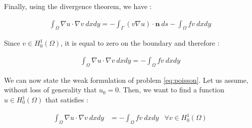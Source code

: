 Finally, using the divergence theorem, we have : 

\begin{align}
\int_\Omega \nabla u \cdot \nabla v \:dxdy = -\int_\Gamma (v\nabla u) \cdot \textbf{n} \:ds -\int_\Omega f v \:dxdy
\end{align}

Since $v\in H_0^1(\Omega)$, it is equal to zero on the boundary and therefore : 

\begin{align}
\int_\Omega \nabla u \cdot \nabla v \:dxdy = -\int_\Omega f v \:dxdy 
\end{align}

We can now state the weak formulation of problem \ref{eq:poisson}. Let us assume, without loss of generality that $u_0 = 0$. Then, we want to find a function $u \in H^1_0(\Omega)$ that satisfies : 

\begin{align}
\int_\Omega \nabla u \cdot \nabla v \:dxdy &= -\int_\Omega f v \:dxdy &\forall v \in H_0^1(\Omega) \label{eq:weakform} 
\end{align}

 